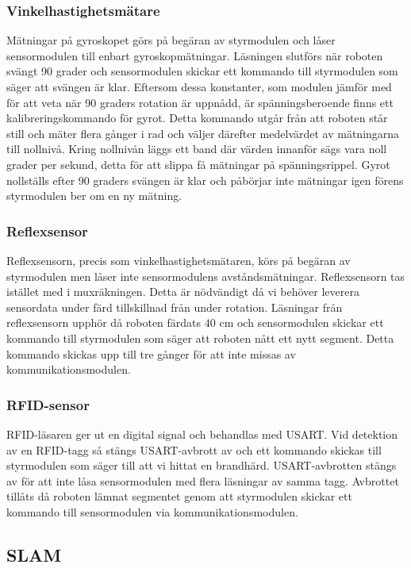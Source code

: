 \documentclass[a4paper,12pt,fleqn]{article}
\begin{document}
\subsubsection{Vinkelhastighetsmätare}
Mätningar på gyroskopet görs på begäran av styrmodulen och låser sensormodulen till enbart gyroskopmätningar. 
Läsningen slutförs när roboten svängt 90 grader och sensormodulen skickar ett kommando till styrmodulen som säger att svängen är klar. Eftersom dessa konstanter, som modulen jämför med för att veta när 90 graders rotation är uppnådd, är spänningsberoende finns ett kalibreringskommando för gyrot. Detta kommando utgår från att roboten står still och mäter flera gånger i rad och väljer därefter medelvärdet av mätningarna till nollnivå. Kring nollnivån läggs ett band där värden innanför sägs vara noll grader per sekund, detta för att slippa få mätningar på spänningsrippel. Gyrot nollställs efter 90 graders svängen är klar och påbörjar inte mätningar igen förens styrmodulen ber om en ny mätning.

\subsubsection{Reflexsensor}
Reflexsensorn, precis som vinkelhastighetsmätaren, körs på begäran av styrmodulen men låser inte sensormodulens avståndsmätningar. Reflexsensorn tas istället med i muxräkningen. Detta är nödvändigt då vi behöver leverera sensordata under färd tillskillnad från under rotation. Läsningar från reflexsensorn upphör då roboten färdats $40$ cm och sensormodulen skickar ett kommando till styrmodulen
som säger att roboten nått ett nytt segment. Detta kommando skickas upp till tre gånger för att inte missas av kommunikationsmodulen.

\subsubsection{RFID-sensor}

RFID-läsaren ger ut en digital signal och behandlas med USART. Vid detektion av en RFID-tagg så stängs USART-avbrott av och ett kommando skickas till styrmodulen som säger till att vi hittat en brandhärd. 
USART-avbrotten stängs av för att inte låsa sensormodulen med flera läsningar av samma tagg. Avbrottet tillåts då roboten lämnat segmentet genom att styrmodulen skickar ett kommando till sensormodulen via kommunikationsmodulen.

\subsection{SLAM}
\end{document}
